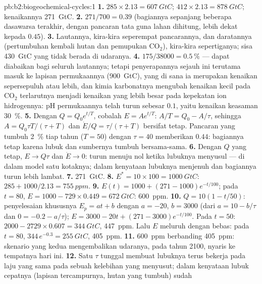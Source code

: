 \begin{solution}{pb:b2:biogeochemical-cycles:1}
\textbf{1.} $285\times 2.13 = \qty{607}{GtC}$; $412\times 2.13 =
\qty{878}{GtC}$; kenaikannya \qty{271}{GtC}.
\textbf{2.} $271/700 = 0.39$ (bagiannya sepanjang beberapa dasawarsa
terakhir, dengan pancaran tata guna lahan dihitung, lebih dekat kepada
$0.45$).
\textbf{3.} Lautannya, kira-kira seperempat pancarannya, dan
daratannya (pertumbuhan kembali hutan dan pemupukan $\mathrm{CO_2}$),
kira-kira sepertiganya; sisa \qty{430}{GtC} yang tidak berada di
udaranya.
\textbf{4.} $175/38000 = \qty{0.5}{\%}$ --- dapat diabaikan bagi
seluruh lautannya; tetapi penyerapannya sejauh ini terutama masuk ke
lapisan permukaannya (\qty{900}{GtC}), yang di sana ia merupakan
kenaikan sepersepuluh atau lebih, dan kimia karbonatnya mengubah
kenaikan kecil pada $\mathrm{CO_2}$ terlarutnya menjadi kenaikan yang
lebih besar pada kepekatan ion hidrogennya: pH permukaannya telah turun
sebesar $0.1$, yaitu kenaikan keasaman \qty{30}{\%}.
\textbf{5.} Dengan $Q = Q_0 e^{t/T}$, cobalah $E = Ae^{t/T}$: $A/T = Q_0 -
A/\tau$, sehingga $A = Q_0\tau T/(\tau + T)$ dan 
$\dot E/Q = \tau/(\tau + T)$ bersifat tetap. Pancaran yang tumbuh
\qty{2}{\%} tiap tahun ($T = 50$) dengan $\tau = 40$ memberikan $0.44$:
bagiannya tetap karena lubuk dan sumbernya tumbuh bersama-sama.
\textbf{6.} Dengan $Q$ yang tetap, $E \to Q\tau$ dan $\dot E \to 0$:
 turun menuju nol ketika lubuknya menyusul ---
di dalam model satu kotaknya; dalam kenyataan lubuknya menjenuh dan
bagiannya turun lebih lambat.
\textbf{7.} \qty{271}{GtC}.
\textbf{8.} $E^{*} = 10\times 100 = \qty{1000}{GtC}$: $285 +
1000/2.13 = \qty{755}{ppm}$.
\textbf{9.} $E(t) = 1000 + (271 - 1000)e^{-t/100}$; pada $t = 80$,
$E = 1000 - 729\times 0.449 = \qty{672}{GtC}$: \qty{600}{ppm}.
\textbf{10.} $Q = 10(1 - t/50)$: penyelesaian khususnya $E_p = at + b$
dengan $a = -20$, $b = 3000$ (dari $a = 10 - b/\tau$ dan $0 = -0.2 -
a/\tau$); $E = 3000 - 20t + (271 - 3000)e^{-t/100}$. Pada $t = 50$:
$2000 - 2729\times 0.607 = \qty{344}{GtC}$, \qty{447}{ppm}. Lalu $E$
meluruh dengan bebas: pada $t = 80$, $344\,e^{-0.3} = \qty{255}{GtC}$,
\qty{405}{ppm}.
\textbf{11.} \qty{600}{ppm} berbanding \qty{405}{ppm}: skenario yang
kedua mengembalikan udaranya, pada tahun 2100, nyaris ke tempatnya hari
ini.
\textbf{12.} Satu $\tau$ tunggal membuat lubuknya terus bekerja pada
laju yang sama pada sebuah kelebihan yang menyusut; dalam kenyataan
lubuk cepatnya (lapisan tercampurnya, hutan yang tumbuh) sudah

\end{solution}
